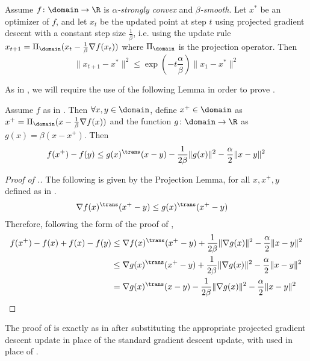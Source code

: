 \begin{theorem} Assume $f\colon\domain\to\R$ is \emph{$\alpha$-strongly convex} and \emph{$\beta$-smooth}. Let $x^{*}$ be an optimizer of $f$, and let $x_{t}$ be the updated point at step $t$ using projected gradient descent with a constant step size $\frac{1}{\beta}$, i.e. using the update rule $x_{t+1} = \Pi_{\domain}(x_{t} - \frac{1}{\beta}\nabla f(x_{t}))$ where $\Pi_{\domain}$ is the projection operator. Then
\[
\|x_{t+1} - x^*\|^2 \leq \exp{(-t \frac{\alpha}{\beta})}\|x_1 - x^*\|^2
\]
\end{theorem}
As in , we will require the use of the following Lemma in order to prove . 

\begin{lemma}
    Assume $f$ as in . Then $\forall x,y \in \domain$, define $x^+\in\domain$ as $x^+ = \Pi_{\domain}(x - \frac{1}{\beta}\nabla f(x))$ and the function $g\colon\domain\to\R$ as $g(x) = \beta(x-x^+)$. Then
    \[
        f(x^+) - f(y) \leq g(x)^\trans (x-y) - \frac{1}{2\beta}\|g(x)\|^2 - \frac{\alpha}{2}\|x-y\|^2
    \]
\end{lemma}

\begin{proof}[Proof of .]
    The following is given by the Projection Lemma, for all $x,x^+,y$ defined as in .
    \begin{align*}
        \nabla f(x)^\trans (x^+ - y) &\leq g(x)^\trans(x^+ - y)
    \end{align*}
    Therefore, following the form of the proof of ,
    \begin{align*}
        f(x^+) - f(x) + f(x) - f(y) &\leq \nabla f(x)^\trans(x^+-y) + \frac{1}{2\beta}\|\nabla g(x)\|^2 - \frac{\alpha}{2}\|x-y\|^2\\
        &\leq \nabla g(x)^\trans(x^+-y) + \frac{1}{2\beta}\|\nabla g(x)\|^2 - \frac{\alpha}{2}\|x-y\|^2\\
        &= \nabla g(x)^\trans(x-y) - \frac{1}{2\beta}\|\nabla g(x)\|^2 - \frac{\alpha}{2}\|x-y\|^2\\
    \end{align*}
\end{proof}
The proof of  is exactly as in  after substituting the appropriate projected gradient descent update in place of the standard gradient descent update, with  used in place of . 